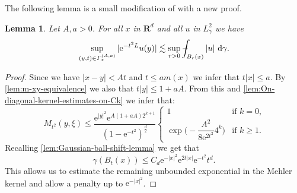 \documentclass[a4paper,oneside,10pt]{amsproc}
\theoremstyle{plain}
\newtheorem{lemma}{Lemma}
\theoremstyle{remark}
\theoremstyle{definition}
\newcommand{\D}{\,\textup{d}}
\newcommand{\LHG}{{L^2_\gamma}}
\def\Xint#1{\mathchoice
  {\XXint\displaystyle\textstyle{#1}}%
  {\XXint\textstyle\scriptstyle{#1}}%
  {\XXint\scriptstyle\scriptscriptstyle{#1}}%
  {\XXint\scriptscriptstyle\scriptscriptstyle{#1}}%
  \!\int}
\def\XXint#1#2#3{{\setbox0=\hbox{$#1{#2#3}{\int}$ }
    \vcenter{\hbox{$#2#3$ }}\kern-.535\wd0}}
\def\dashint{\Xint-}
\renewcommand{\leq}{\leqslant}
\renewcommand{\leq}{\leqslant}
\renewcommand{\geq}{\geqslant}
\newcommand{\R}{\mathbf R}
\newcommand{\e}{\mathrm{e}} %
\renewcommand{\leq}{\leqslant}%
\renewcommand{\geq}{\geqslant}%
\begin{document}
The following lemma is a small modification of \cite[lemma 1.1]{Pineda2008} with a new proof.
\begin{lemma}\label{lem:Maximal-function-cone}
  Let $A, a > 0$. For all $x$ in $\R^d$ and all $u$ in $\LHG$ we have
  \begin{equation}
    \label{eq:maximal_function_cone}
    \sup_{(y, t) \in \Gamma_x^{(A, a)}} |\e^{-t^2 L} u(y)| \lesssim
    \sup_{r > 0} \dashint_{B_r(x)} |u| \, \D\gamma.
  \end{equation}
\end{lemma}
\begin{proof}
  Since we have $|x - y| < At$ and $t \leq a m(x)$ we infer that $t
  |x| \leq a$. By \autoref{lem:m-xy-equivalence} we also that $t
  |y| \leq 1 + aA$. From this and \autoref{lem:On-diagonal-kernel-estimates-on-Ck} we infer that:
  \begin{equation}
    \label{eq:Mehler-kernel-estimate-one-sided-bound}
    M_{t^2}(y, \xi) \leq \frac{\e^{|y|^2} \e^{A(1 + aA) 2^{k + 1}}}{(1 - \e^{-t^2})^{\frac{d}2}}
    \begin{cases}
      1 &\text{if $k = 0$,}\\
      \exp\biggl(-\dfrac{A^2}{8 \e^{2t^2}} 4^k \biggr) &\text{if $k
        \geq 1$.}
    \end{cases}
  \end{equation}
  Recalling \autoref{lem:Gaussian-ball-shift-lemma} we get that
  \begin{equation}
    \label{eq:Gaussian-ball-Maximal-function-cone-proof-1}
    \gamma(B_t(x)) \leq C_d \e^{-|x|^2} \e^{2 t |x|} \e^{-t^2} t^d.
  \end{equation}
  This allows us to estimate the remaining unbounded exponential in the
  Mehler kernel and allow a penalty up to $\e^{-|x|^2}$.


\end{proof}
\end{document}

